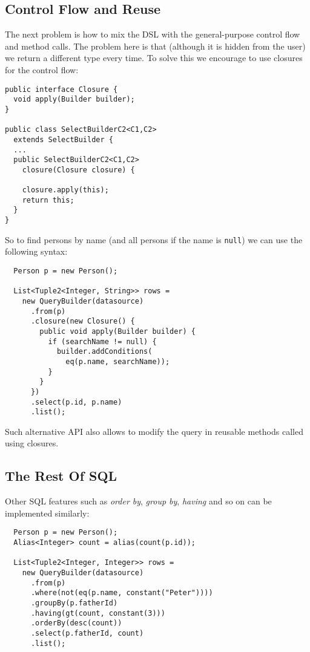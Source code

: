 \documentclass{sig-alternate}
\begin{document}
\subsection{Control Flow and Reuse}

The next problem is how to mix the DSL with the general-purpose control flow and method calls. The problem here is that (although it is hidden from the user) we return a different type every time. To solve this we encourage to use closures for the control flow:

\begin{verbatim}
public interface Closure {
  void apply(Builder builder);
}

public class SelectBuilderC2<C1,C2> 
  extends SelectBuilder {
  ...
  public SelectBuilderC2<C1,C2> 
    closure(Closure closure) {

    closure.apply(this);
    return this;
  }
}
\end{verbatim}

So to find persons by name (and all persons if the name is \verb!null!) we can use the following syntax:

\begin{verbatim}
  Person p = new Person();

  List<Tuple2<Integer, String>> rows =
    new QueryBuilder(datasource)
      .from(p)
      .closure(new Closure() {
        public void apply(Builder builder) {
          if (searchName != null) {
            builder.addConditions(
              eq(p.name, searchName));
          }
        }
      })
      .select(p.id, p.name)
      .list();
\end{verbatim}

Such alternative API also allows to modify the query in reusable methods called using closures.

\subsection{The Rest Of SQL}

Other SQL features such as \emph{order by}, \emph{group by}, \emph{having} and so on can be implemented similarly:

\begin{verbatim}
  Person p = new Person();
  Alias<Integer> count = alias(count(p.id));

  List<Tuple2<Integer, Integer>> rows =
    new QueryBuilder(datasource)
      .from(p)
      .where(not(eq(p.name, constant("Peter"))))
      .groupBy(p.fatherId)
      .having(gt(count, constant(3)))
      .orderBy(desc(count))
      .select(p.fatherId, count)
      .list();
\end{verbatim}
\end{document}
